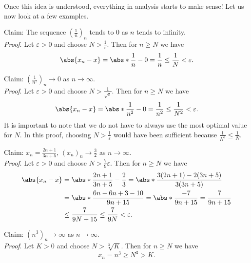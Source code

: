 \documentclass[../real_analysis.tex]{subfiles}
\begin{document}
        Once this idea is understood, everything in analysis starts to make sense! Let us now look at a few examples.
        \begin{example}
            Claim: The sequence $\left(\frac{1}{n}\right)_n$ tends to 0 as $n$ tends to infinity.\\
            \textit{Proof}. Let $\varepsilon>0$ and choose $N>\frac{1}{\varepsilon}$. Then for $n\geq N$ we have
            \begin{equation*}
                \abs{x_n-x}=\abs*{\frac{1}{n}-0}=\frac{1}{n}\leq\frac{1}{N}<\varepsilon.
            \end{equation*}
        \end{example}
        \begin{example}
            Claim: $\left(\frac{1}{n^2}\right)_n\to0$ as $n\to\infty$.\\
            \textit{Proof}. Let $\varepsilon>0$ and choose $N>\frac{1}{\sqrt{\varepsilon}}$. Then for $n\geq N$ we have
            \begin{equation*}
                \abs{x_n-x}=\abs*{\frac{1}{n^2}-0}=\frac{1}{n^2}\leq\frac{1}{N^2}<\varepsilon.
            \end{equation*}
            It is important to note that we do not have to always use the most optimal value for $N$. In this proof, choosing $N>\frac{1}{\varepsilon}$ would have been sufficient because $\frac{1}{N^2}\leq\frac{1}{N}$.
        \end{example}
        \begin{example}
            Claim: $x_n=\frac{2n+1}{3n+5}$, $(x_n)_n\to\frac{3}{2}$ as $n\to\infty$.\\
            \textit{Proof}. Let $\varepsilon>0$ and choose $N>\frac{7}{9}\varepsilon$. Then for $n\geq N$ we have
            \begin{align*}
                \abs{x_n-x}&=\abs*{\frac{2n+1}{3n+5}-\frac{2}{3}}=\abs*{\frac{3(2n+1)-2(3n+5)}{3(3n+5)}}\\
                &=\abs*{\frac{6n-6n+3-10}{9n+15}}=\abs*{\frac{-7}{9n+15}}=\frac{7}{9n+15}\\
                &\leq\frac{7}{9N+15}\leq\frac{7}{9N}<\varepsilon.
            \end{align*}
        \end{example}
        \begin{example}
            Claim: $(n^3)_n\to\infty$ as $n\to\infty$.\\
            \textit{Proof}. Let $K>0$ and choose $N>\sqrt[3]{K}$. Then for $n\geq N$ we have
            \begin{equation*}
                x_n=n^3\geq N^3>K.
            \end{equation*}
        \end{example}
\end{document}
